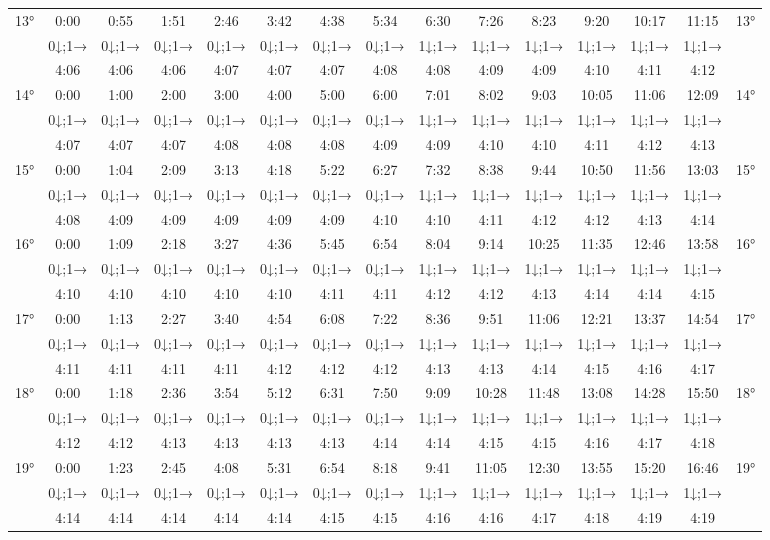 \begin{scriptsize}
\begin{tabular}{c || c | c | c | c | c | c | c | c | c | c | c | c | c || c}
		\multirow{3}{*}{13°}&0:00&0:55&1:51&2:46&3:42&4:38&5:34&6:30&7:26&8:23&9:20&10:17&11:15&\multirow{3}{*}{13°}\\ \space&0↓;1→&0↓;1→&0↓;1→&0↓;1→&0↓;1→&0↓;1→&0↓;1→&1↓;1→&1↓;1→&1↓;1→&1↓;1→&1↓;1→&1↓;1→&\space\\&4:06&4:06&4:06&4:07&4:07&4:07&4:08&4:08&4:09&4:09&4:10&4:11&4:12&\space\\\hline
		\multirow{3}{*}{14°}&0:00&1:00&2:00&3:00&4:00&5:00&6:00&7:01&8:02&9:03&10:05&11:06&12:09&\multirow{3}{*}{14°}\\ \space&0↓;1→&0↓;1→&0↓;1→&0↓;1→&0↓;1→&0↓;1→&0↓;1→&1↓;1→&1↓;1→&1↓;1→&1↓;1→&1↓;1→&1↓;1→&\space\\&4:07&4:07&4:07&4:08&4:08&4:08&4:09&4:09&4:10&4:10&4:11&4:12&4:13&\space\\\hline
		\multirow{3}{*}{15°}&0:00&1:04&2:09&3:13&4:18&5:22&6:27&7:32&8:38&9:44&10:50&11:56&13:03&\multirow{3}{*}{15°}\\ \space&0↓;1→&0↓;1→&0↓;1→&0↓;1→&0↓;1→&0↓;1→&0↓;1→&1↓;1→&1↓;1→&1↓;1→&1↓;1→&1↓;1→&1↓;1→&\space\\&4:08&4:09&4:09&4:09&4:09&4:09&4:10&4:10&4:11&4:12&4:12&4:13&4:14&\space\\\hline
		\multirow{3}{*}{16°}&0:00&1:09&2:18&3:27&4:36&5:45&6:54&8:04&9:14&10:25&11:35&12:46&13:58&\multirow{3}{*}{16°}\\ \space&0↓;1→&0↓;1→&0↓;1→&0↓;1→&0↓;1→&0↓;1→&0↓;1→&1↓;1→&1↓;1→&1↓;1→&1↓;1→&1↓;1→&1↓;1→&\space\\&4:10&4:10&4:10&4:10&4:10&4:11&4:11&4:12&4:12&4:13&4:14&4:14&4:15&\space\\\hline
		\multirow{3}{*}{17°}&0:00&1:13&2:27&3:40&4:54&6:08&7:22&8:36&9:51&11:06&12:21&13:37&14:54&\multirow{3}{*}{17°}\\ \space&0↓;1→&0↓;1→&0↓;1→&0↓;1→&0↓;1→&0↓;1→&0↓;1→&1↓;1→&1↓;1→&1↓;1→&1↓;1→&1↓;1→&1↓;1→&\space\\&4:11&4:11&4:11&4:11&4:12&4:12&4:12&4:13&4:13&4:14&4:15&4:16&4:17&\space\\\hline
		\multirow{3}{*}{18°}&0:00&1:18&2:36&3:54&5:12&6:31&7:50&9:09&10:28&11:48&13:08&14:28&15:50&\multirow{3}{*}{18°}\\ \space&0↓;1→&0↓;1→&0↓;1→&0↓;1→&0↓;1→&0↓;1→&0↓;1→&1↓;1→&1↓;1→&1↓;1→&1↓;1→&1↓;1→&1↓;1→&\space\\&4:12&4:12&4:13&4:13&4:13&4:13&4:14&4:14&4:15&4:15&4:16&4:17&4:18&\space\\\hline
		\multirow{3}{*}{19°}&0:00&1:23&2:45&4:08&5:31&6:54&8:18&9:41&11:05&12:30&13:55&15:20&16:46&\multirow{3}{*}{19°}\\ \space&0↓;1→&0↓;1→&0↓;1→&0↓;1→&0↓;1→&0↓;1→&0↓;1→&1↓;1→&1↓;1→&1↓;1→&1↓;1→&1↓;1→&1↓;1→&\space\\&4:14&4:14&4:14&4:14&4:14&4:15&4:15&4:16&4:16&4:17&4:18&4:19&4:19&\space\\\hline

\end{tabular}
\end{scriptsize}
